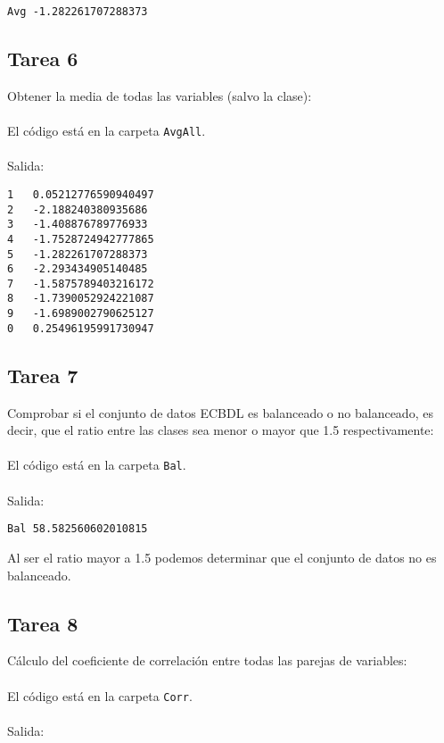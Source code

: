 \begin{lstlisting}
Avg -1.282261707288373
\end{lstlisting}

\subsection{Tarea 6}

Obtener la media de todas las variables (salvo la clase):
\\ \\
El código está en la carpeta \texttt{AvgAll}.
\\ \\
Salida:

\begin{lstlisting}
1   0.05212776590940497
2   -2.188240380935686
3   -1.408876789776933
4   -1.7528724942777865
5   -1.282261707288373
6   -2.293434905140485
7   -1.5875789403216172
8   -1.7390052924221087
9   -1.6989002790625127
0   0.25496195991730947
\end{lstlisting}

\subsection{Tarea 7}

Comprobar si el conjunto de datos ECBDL es balanceado o no balanceado, es decir, que el ratio entre las clases sea menor o mayor que 1.5 respectivamente:
\\ \\
El código está en la carpeta \texttt{Bal}.
\\ \\
Salida:

\begin{lstlisting}
Bal 58.582560602010815
\end{lstlisting}

Al ser el ratio mayor a 1.5 podemos determinar que el conjunto de datos no es balanceado.

\subsection{Tarea 8}

Cálculo del coeficiente de correlación entre todas las parejas de variables:
\\ \\
El código está en la carpeta \texttt{Corr}.
\\ \\
Salida:

